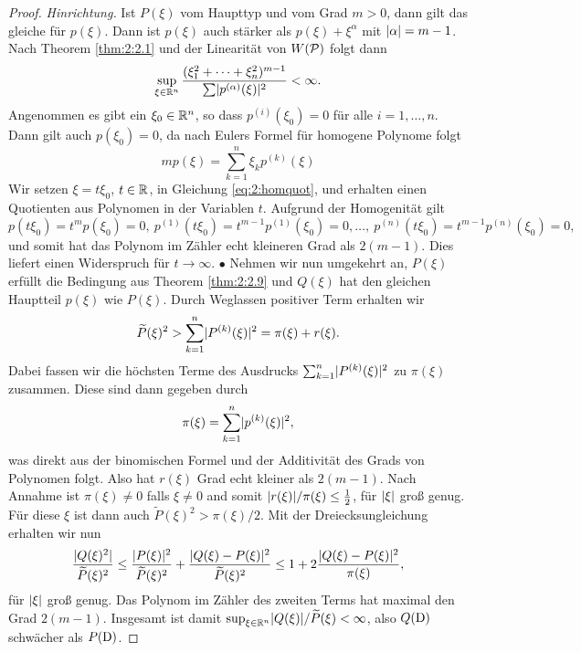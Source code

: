 \begin{proof}
{\it Hinrichtung.} Ist $P(\xi)$ vom Haupttyp und vom Grad $m>0$,
dann gilt das gleiche für $p(\xi)$.
Dann ist $p(\xi)$ auch stärker als $p(\xi)+\xi^\alpha$
mit $\lvert\alpha\rvert=m-1$.
Nach Theorem \ref{thm:2:2.1} und der Linearität von $W(\mathcal P)$
folgt dann
\begin{equation}\label{eq:2:homquot}
\sup_{\xi\in\mathbb R^n}\frac{(\xi^2_1+\dots+\xi^2_n)^{m-1}}{\sum\lvert p^{(\alpha)}(\xi)\rvert^2}<\infty.
\end{equation}
Angenommen es gibt ein $\xi_0\in\mathbb R^n$,
so dass $p^{(i)}(\xi_0)=0$ für alle $i=1,\dots,n$.
Dann gilt auch $p(\xi_0)=0$, da nach Eulers Formel für homogene Polynome folgt
\begin{equation}
mp(\xi)=\sum_{k=1}^n\xi_kp^{(k)}(\xi)
\end{equation}
Wir setzen $\xi=t\xi_0$, $t\in\mathbb R$, in Gleichung \eqref{eq:2:homquot},
und erhalten einen Quotienten aus Polynomen in der Variablen $t$.
Aufgrund der Homogenität gilt
\begin{equation}
p(t\xi_0)=t^mp(\xi_0)=0,~p^{(1)}(t\xi_0)=t^{m-1}p^{(1)}(\xi_0)=0,
\dots,~p^{(n)}(t\xi_0)=t^{m-1}p^{(n)}(\xi_0)=0,
\end{equation}
und somit hat das Polynom im Zähler echt kleineren Grad als $2(m-1)$.
Dies liefert einen Widerspruch für $t\to\infty$. $\bullet$
Nehmen wir nun umgekehrt an, $P(\xi)$ erfüllt die Bedingung aus Theorem \ref{thm:2:2.9}
und $Q(\xi)$ hat den gleichen Hauptteil $p(\xi)$ wie $P(\xi)$.
Durch Weglassen positiver Term erhalten wir 
\begin{equation}
\widetilde{P}(\xi)^2>\sum_{k=1}^n\lvert P^{(k)}(\xi)\rvert^2=\pi(\xi)+r(\xi).
\end{equation}
Dabei fassen wir die höchsten Terme des Ausdrucks
$\sum_{k=1}^n\lvert P^{(k)}(\xi)\rvert^2$ zu $\pi(\xi)$ zusammen.
Diese sind dann gegeben durch
\begin{equation}
\pi(\xi)=\sum_{k=1}^n\lvert p^{(k)}(\xi)\rvert^2,
\end{equation}
was direkt aus der binomischen Formel
und der Additivität des Grads von Polynomen folgt.
Also hat $r(\xi)$ Grad echt kleiner als $2(m-1)$.
Nach Annahme ist $\pi(\xi)\neq0$ falls $\xi\neq0$
and somit $\lvert r(\xi)\rvert/\pi(\xi)\leq\tfrac12$,
für $\lvert\xi\rvert$ groß genug.
Für diese $\xi$ ist dann auch $\widetilde{P}(\xi)^2>\pi(\xi)/2$.
Mit der Dreiecksungleichung erhalten wir nun
\begin{equation}
\frac{\lvert Q(\xi)^2\rvert}{\widetilde{P}(\xi)^2}
\leq\frac{\lvert P(\xi)\rvert^2}{\widetilde{P}(\xi)^2}+\frac{\lvert Q(\xi)-P(\xi)\rvert^2}{\widetilde{P}(\xi)^2}
\leq1+2\frac{\lvert Q(\xi)-P(\xi)\rvert^2}{\pi(\xi)},
\end{equation}
für $\lvert\xi\rvert$ groß genug.
Das Polynom im Zähler des zweiten Terms hat maximal den Grad $2(m-1)$.
Insgesamt ist damit $\sup_{\xi\in\mathbb R^n}\lvert Q(\xi)\rvert/\widetilde{P}(\xi)<\infty$,
also $Q(\mathrm D)$ schwächer als $P(\mathrm D)$.
\end{proof}

